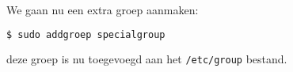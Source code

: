 We gaan nu een extra groep aanmaken:
\begin{lstlisting}[language=bash]
$ sudo addgroep specialgroup
\end{lstlisting}
deze groep is nu toegevoegd aan het \texttt{/etc/group} bestand.

